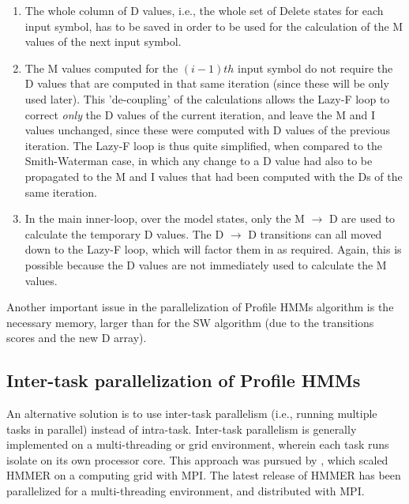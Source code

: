 \begin{enumerate}

\item The whole column of D values, i.e., the whole set of Delete states for each input symbol, has to be saved in order to be used for the calculation of the M values of the next input symbol.

\item The M values computed for the $(i-1)th$ input symbol do not require the D values that are computed in that same iteration (since these will be only used later). This 'de-coupling' of the calculations allows the Lazy-F loop to correct \emph{only} the D values of the current iteration, and leave the M and I values unchanged, since these were computed with D values of the previous iteration. The Lazy-F loop is thus quite simplified, when compared to the Smith-Waterman case, in which any change to a D value had also to be propagated to the M and I values that had been computed with the Ds of the same iteration. 

\item In the main inner-loop, over the model states, only the M $\rightarrow$ D are used to calculate the temporary D values. The D $\rightarrow$ D transitions can all moved down to the Lazy-F loop, which will factor them in as required. Again, this is possible because the D values are not immediately used to calculate the M values.

\end{enumerate}



Another important issue in the parallelization of Profile HMMs algorithm is the necessary memory, larger than for the \ac{SW} algorithm (due to the transitions scores and the new D array).


\subsection{Inter-task parallelization of Profile HMMs}

An alternative solution is to use inter-task parallelism (i.e., running multiple tasks in parallel) instead of intra-task.
Inter-task parallelism is generally implemented on a multi-threading or grid environment, wherein each task runs isolate on its own processor core. This approach was pursued by \cite{hmmer-mpi}, which scaled HMMER on a computing grid with MPI. The latest release of HMMER has been parallelized for a multi-threading environment, and distributed with MPI.

